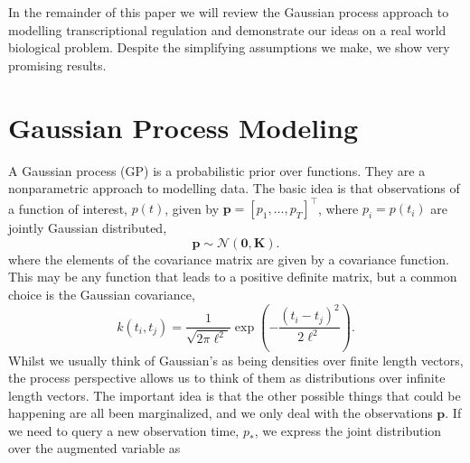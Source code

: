 \documentclass{article}
\begin{document}
In the remainder of this paper we will review the Gaussian process
approach to modelling transcriptional regulation and demonstrate our
ideas on a real world biological problem. Despite the simplifying
assumptions we make, we show very promising results.

\section{Gaussian Process Modeling}

A Gaussian process (GP) is a probabilistic prior over functions\cite{Williams:}. They are a nonparametric approach to modelling data. The basic idea is that observations of a function of interest, $p(t)$, given by $\mathbf{p} = \left[p_1, \dots, p_T\right]^\top$, where $p_i=p(t_i)$ are jointly Gaussian distributed,
\[
\mathbf{p} \sim \mathcal{N}(\mathbf{0}, \mathbf{K}).
\]
where the elements of the covariance matrix are given by a covariance function. This may be any function that leads to a positive definite matrix, but a common choice is the Gaussian covariance,
\[
k(t_i, t_j) = \frac{1}{\sqrt{2\pi \ell^2}}\exp\left(-\frac{(t_i -t_j)^2}{2\ell^2}\right).
\]
Whilst we usually think of Gaussian's as being densities over finite length vectors, the process perspective allows us to think of them as distributions over infinite length vectors. The important idea is that the other possible things that could be happening are all been marginalized, and we only deal with the observations $\mathbf{p}$. If we need to query a new observation time, $p_*$, we express the joint distribution over the augmented variable as
\[
\]




\end{document}
